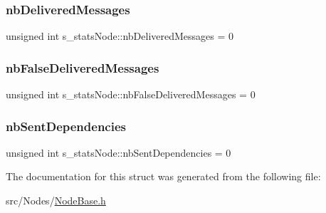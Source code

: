 \subsubsection{\texorpdfstring{nb\+Delivered\+Messages}{nbDeliveredMessages}}
{\footnotesize\ttfamily unsigned int s\+\_\+stats\+Node\+::nb\+Delivered\+Messages = 0}

\mbox{\label{structs__stats_node_a009b1278ace8dbe831b9a3cdfef773e0}} 
\subsubsection{\texorpdfstring{nb\+False\+Delivered\+Messages}{nbFalseDeliveredMessages}}
{\footnotesize\ttfamily unsigned int s\+\_\+stats\+Node\+::nb\+False\+Delivered\+Messages = 0}

\mbox{\label{structs__stats_node_af01c78389a27c9eeff8033f6b3d3beee}} 
\subsubsection{\texorpdfstring{nb\+Sent\+Dependencies}{nbSentDependencies}}
{\footnotesize\ttfamily unsigned int s\+\_\+stats\+Node\+::nb\+Sent\+Dependencies = 0}



The documentation for this struct was generated from the following file\+:\begin{DoxyCompactItemize}
\item 
src/\+Nodes/\hyperlink{_node_base_8h}{Node\+Base.\+h}\end{DoxyCompactItemize}
